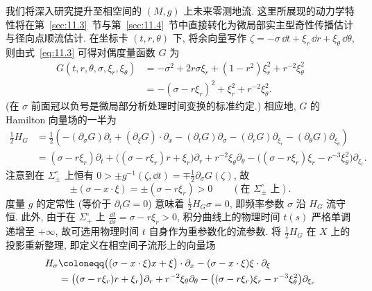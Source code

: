 我们将深入研究提升至相空间的 $(M, g)$ 上未来零测地流. 这里所展现的动力学特性将在第~\ref{sec:11.3}~节与第~\ref{sec:11.4}~节中直接转化为微局部实主型奇性传播估计与径向点顺流估计. 在坐标卡 $(t, r, \theta)$ 下, 将余向量写作 $\zeta = -\sigma \,\dd t + \xi_r \,\dd r + \xi_\theta \,\dd\theta$, 则由式~\eqref{eq:11.3} 可得对偶度量函数 $G$ 为
\begin{equation}\label{eq:11.8}
\begin{aligned}
    G(t, r, \theta, \sigma, \xi_r, \xi_\theta) &= -\sigma^2 + 2r \sigma \xi_r + (1 - r^2)\xi_r^2 + r^{-2}\xi_\theta^2 \\
    &= -(\sigma - r\xi_r)^2 + \xi_r^2 + r^{-2}\xi_\theta^2.
\end{aligned}
\end{equation}
(在 $\sigma$ 前面冠以负号是微局部分析处理时间变换的标准约定.) 相应地, $G$ 的 Hamilton 向量场的一半为
\begin{equation}\label{eq:11.9}
\begin{aligned}
    \frac{1}{2} H_G &= \frac{1}{2}\left( -(\partial_\sigma G)\partial_t + (\partial_\xi G)\cdot\partial_x - (\partial_t G)\partial_\sigma - (\partial_r G)\partial_{\xi_r} - (\partial_\theta G)\partial_{\xi_\theta} \right) \\
    &= (\sigma - r\xi_r)\partial_t + \big((\sigma - r\xi_r)r + \xi_r\big)\partial_r + r^{-2}\xi_\theta \partial_\theta - \big((\sigma - r\xi_r)\xi_r - r^{-3}\xi_\theta^2\big)\partial_{\xi_r}.
\end{aligned}
\end{equation}
注意到在 $\Sigma_\pm^\circ$ 上恒有 $0 > \pm g^{-1}(\zeta, \dd t) = \mp \frac{1}{2}\partial_\sigma G(\zeta)$, 故
\begin{equation}\label{eq:11.10}
    \pm(\sigma - x \cdot \xi) = \pm(\sigma - r\xi_r) > 0 \qquad (\text{在 } \Sigma_\pm^\circ \text{ 上}).
\end{equation}
度量 $g$ 的定常性 (等价于 $\partial_t G = 0$) 意味着 $\frac{1}{2} H_G \sigma = 0$, 即频率参数 $\sigma$ 沿 $H_G$ 流守恒. 此外, 由于在 $\Sigma_+^\circ$ 上 $\frac{\dd t}{\dd s} = \sigma - r\xi_r > 0$, 积分曲线上的物理时间 $t(s)$ 严格单调递增至 $+\infty$, 故可选用物理时间 $t$ 自身作为重参数化的流参数. 将 $\frac{1}{2} H_G$ 在 $X$ 上的投影重新整理, 即定义在相空间子流形上的向量场
\begin{equation}\label{eq:11.11}
\begin{aligned}
    H_\sigma &\defeq \big((\sigma - x \cdot \xi)x + \xi\big)\cdot\partial_x - (\sigma - x \cdot \xi)\xi \cdot \partial_\xi \\
    &= \big((\sigma - r\xi_r)r + \xi_r\big)\partial_r + r^{-2}\xi_\theta \partial_\theta - \big((\sigma - r\xi_r)\xi_r - r^{-3}\xi_\theta^2\big)\partial_{\xi_r}
\end{aligned}
\end{equation}
